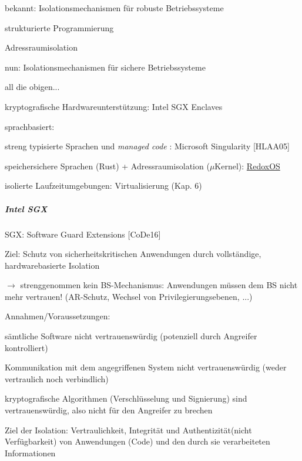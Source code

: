 \documentclass[a4paper]{article}
\begin{document}
\begin{multicols}{3}
    \begin{itemize*}
        \item
        bekannt: Isolationsmechanismen für robuste Betriebssysteme
        \begin{itemize*}
            \item strukturierte Programmierung
            \item Adressraumisolation
        \end{itemize*}
        \item
        nun: Isolationsmechanismen für sichere Betriebssysteme
        \begin{itemize*}
            \item all die obigen...
            \item kryptografische Hardwareunterstützung: Intel SGX Enclaves
            \item sprachbasiert: \begin{itemize*} \item streng typisierte Sprachen und \emph{managed code} : Microsoft Singularity {[}HLAA05{]} \item speichersichere Sprachen (Rust) + Adressraumisolation ($\mu$Kernel): \href{https://www.redox-os.org/}{RedoxOS} \end{itemize*}
            \item isolierte Laufzeitumgebungen: Virtualisierung (Kap. 6)
        \end{itemize*}
    \end{itemize*}


    \subparagraph{Intel SGX}

    \begin{itemize*}
        \item
        SGX: Software Guard Extensions {[}CoDe16{]}
        \item
        Ziel: Schutz von sicherheitskritischen Anwendungen durch vollständige,
        hardwarebasierte Isolation
        \item
        $\rightarrow$ strenggenommen kein BS-Mechanismus:
        Anwendungen müssen dem BS nicht mehr vertrauen! (AR-Schutz, Wechsel
        von Privilegierungsebenen, ...)
        \item
        Annahmen/Voraussetzungen:
        \begin{enumerate*}

            \item sämtliche Software nicht vertrauenswürdig (potenziell durch Angreifer kontrolliert)
            \item Kommunikation mit dem angegriffenen System nicht vertrauenswürdig (weder vertraulich noch verbindlich)
            \item kryptografische Algorithmen (Verschlüsselung und Signierung) sind vertrauenswürdig, also nicht für den Angreifer zu brechen
            \item Ziel der Isolation: Vertraulichkeit, Integrität und Authentizität(nicht Verfügbarkeit) von Anwendungen (Code) und den durch sie verarbeiteten Informationen
        \end{enumerate*}
    \end{itemize*}



\end{multicols}
\end{document}
